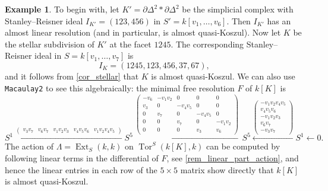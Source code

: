 \documentclass[a4paper,10pt]{amsart}
\theoremstyle{definition}
\newtheorem{example}[theorem]{Example}
\theoremstyle{remark}
\DeclareMathOperator{\Ext}{Ext}
\DeclareMathOperator{\Tor}{Tor}
\begin{document}
\begin{example}%
\label{ex_AQK}
To begin with, let $K'=\partial \Delta^2\ast\partial \Delta^2$ be the simplicial complex with Stanley--Reisner ideal $I_{K'} = (123,456)$ in $S'=k[v_1,\ldots,v_6]$. Then $I_{K'}$ has an almost linear resolution (and in particular, is almost quasi-Koszul). Now let $K$ be the stellar subdivision of $K'$ at the facet $1245$. The corresponding Stanley--Reisner ideal in $S=k[v_1,\ldots,v_7]$ is
\[
I_K=(1245,123,456,37,67),
\]
and it follows from \cref{cor_stellar} that $K$ is almost quasi-Koszul. We can also use {\tt Macaulay2} to see this algebraically: the minimal free resolution $F$ of $k[K]$ is
\[
{S^{1}}
\xleftarrow{\left(\!\begin{smallmatrix}v_{3}v_{7}&v_{6}v_{7}&v_{1}v_{2}v_{3}&v_{4}v_{5}v_{6}&v_{1}v_{2}v_{4}v_{5}\end{smallmatrix}\!\right)}
        {S^{5}}
        \xleftarrow{\left(\!\begin{smallmatrix}
        -v_{6}&-v_{1}v_{2}&0&0&0\\
        v_{3}&0&-v_{4}v_{5}&0&0\\
        0&v_{7}&0&-v_{4}v_{5}&0\\
        0&0&v_{7}&0&-v_{1}v_{2}\\
        0&0&0&v_{3}&v_{6}
        \end{smallmatrix}\!\right)}\,{S^{5}}
        \xleftarrow{\left(\!\begin{smallmatrix}
        -v_{1}v_{2}v_{4}v_{5}\\
        v_{4}v_{5}v_{6}\\
        -v_{1}v_{2}v_{3}\\
        v_{6}v_{7}\\
        -v_{3}v_{7}
        \end{smallmatrix}\!\right)}{S^{1}}\xleftarrow{}{0}.
        \]
        The action of $\Lambda=\Ext_S(k,k)$ on $\Tor^S(k[K],k)$ can be computed by following linear terms in the differential of $F$, see \cref{rem_linear_part_action}, and hence the linear entries in each row of the $5\times 5$ matrix show directly that $k[K]$ is almost quasi-Koszul.


\end{example}
\end{document}
